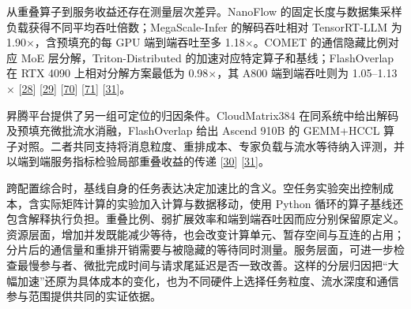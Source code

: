 \documentclass[UTF8,10.5pt,fontset=windows]{ctexart}
\begin{document}
从重叠算子到服务收益还存在测量层次差异。NanoFlow
的固定长度与数据集采样负载获得不同平均吞吐倍数；MegaScale-Infer
的解码吞吐相对 TensorRT-LLM 为 1.90\(\times\)，含预填充的每 GPU 端到端吞吐至多
1.18\(\times\)。COMET 的通信隐藏比例对应 MoE 层分解，Triton-Distributed
的加速对应特定算子和基线；FlashOverlap 在 RTX 4090 上相对分解方案最低为
0.98\(\times\)，其 A800 端到端吞吐则为 1.05--1.13\(\times\)
{[}\protect\hyperlink{ref-zhu2025nanoflow}{28}{]}
{[}\protect\hyperlink{ref-zhu2025megascaleinfer}{29}{]}
{[}\protect\hyperlink{ref-zhang2025comet}{70}{]}
{[}\protect\hyperlink{ref-zheng2025tritondist}{71}{]}
{[}\protect\hyperlink{ref-hong2026flashoverlap}{31}{]}。

昇腾平台提供了另一组可定位的归因条件。CloudMatrix384
在同系统中给出解码及预填充微批流水消融，FlashOverlap 给出 Ascend 910B 的
GEMM+HCCL
算子对照。二者共同支持将消息粒度、重排成本、专家负载与流水等待纳入评测，并以端到端服务指标检验局部重叠收益的传递
{[}\protect\hyperlink{ref-zuo2025cloudmatrix384}{30}{]}
{[}\protect\hyperlink{ref-hong2026flashoverlap}{31}{]}。

跨配置综合时，基线自身的任务表达决定加速比的含义。空任务实验突出控制成本，含实际矩阵计算的实验加入计算与数据移动，使用
Python
循环的算子基线还包含解释执行负担。重叠比例、弱扩展效率和端到端吞吐因而应分别保留原定义。资源层面，增加并发既能减少等待，也会改变计算单元、暂存空间与互连的占用；分片后的通信量和重排开销需要与被隐藏的等待同时测量。服务层面，可进一步检查最慢参与者、微批完成时间与请求尾延迟是否一致改善。这样的分层归因把``大幅加速''还原为具体成本的变化，也为不同硬件上选择任务粒度、流水深度和通信参与范围提供共同的实证依据。
\end{document}
